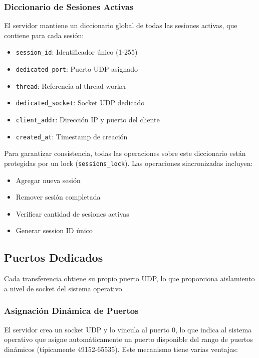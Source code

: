 \subsubsection{Diccionario de Sesiones Activas}

El servidor mantiene un diccionario global de todas las sesiones activas, que contiene para cada sesión:

\begin{itemize}
    \item \texttt{session\_id}: Identificador único (1-255)
    \item \texttt{dedicated\_port}: Puerto UDP asignado
    \item \texttt{thread}: Referencia al thread worker
    \item \texttt{dedicated\_socket}: Socket UDP dedicado
    \item \texttt{client\_addr}: Dirección IP y puerto del cliente
    \item \texttt{created\_at}: Timestamp de creación
\end{itemize}

Para garantizar consistencia, todas las operaciones sobre este diccionario están protegidas por un lock (\texttt{sessions\_lock}). Las operaciones sincronizadas incluyen:

\begin{itemize}
    \item Agregar nueva sesión
    \item Remover sesión completada
    \item Verificar cantidad de sesiones activas
    \item Generar session ID único
\end{itemize}

\subsection{Puertos Dedicados}

Cada transferencia obtiene su propio puerto UDP, lo que proporciona aislamiento a nivel de socket del sistema operativo.

\subsubsection{Asignación Dinámica de Puertos}

El servidor crea un socket UDP y lo vincula al puerto 0, lo que indica al sistema operativo que asigne automáticamente un puerto disponible del rango de puertos dinámicos (típicamente 49152-65535). Este mecanismo tiene varias ventajas:

